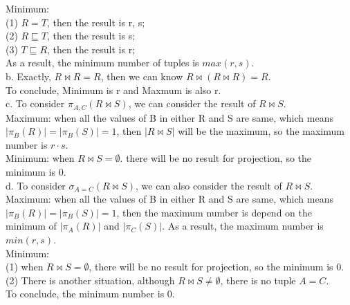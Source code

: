 \documentclass[]{article}
\begin{document}
	Minimum:\\
	
	(1) $R=T$, then the result is r, s;\\
	
	(2) $R\sqsubseteq T$, then the result is s;\\
	
	(3) $T\sqsubseteq R$, then the result is r;\\
	
	As a result, the minimum number of tuples is $max(r, s)$.\\
	
	\noindent b. Exactly, $R\bowtie R=R$, then we can know $R\bowtie(R\bowtie R)=R$. \\
	
	To conclude, Minimum is r and Maxmum is also r.\\
	
	\noindent c. To consider $\pi_{A, C}(R\bowtie S)$, we can consider the result of $R\bowtie S$. \\
	
	Maximum: when all the values of B in either R and S are same, which means $\vert\pi_{B}(R)\vert=\vert\pi_{B}(S)\vert=1$, then $\vert R\bowtie S\vert$ will be the maximum, so the maximum number is $r\cdot s$.\\
	
	Minimum: when $R\bowtie S=\emptyset$. there will be no result for projection, so the minimum is 0.\\
	
	\noindent d. To consider $\sigma_{A=C}(R\bowtie S)$, we can also consider the result of $R\bowtie S$. \\
	
	Maximum: when all the values of B in either R and S are same, which means $\vert\pi_{B}(R)\vert=\vert\pi_{B}(S)\vert=1$, then the maximum number is depend on the minimum of $\vert\pi_{A}(R)\vert$ and $\vert\pi_{C}(S)\vert$. As a result, the maximum number is $min(r, s)$.\\
	
	Minimum: \\
	
	(1) when $R\bowtie S=\emptyset$, there will be no result for projection, so the minimum is 0.\\
	
	(2) There is another situation, although $R\bowtie S\neq\emptyset$, there is no tuple $A=C$.\\
	
	To conclude, the minimum number is 0.
	
	
\end{document}
